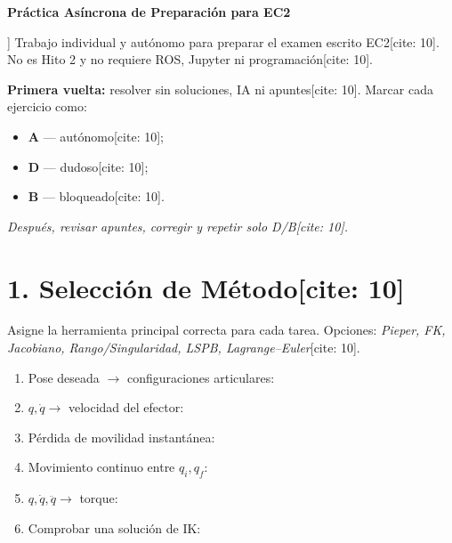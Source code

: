 \documentclass[11pt, a4paper]{article}
\begin{document}
\begin{center}
    \Large\textbf{\textcolor{ucbblue}{Práctica Asíncrona de Preparación para EC2}}\\[0.2cm]
\end{center}

\begin{tcolorbox}[colback=yellow!10, colframe=black, title=\textbf{Propósito y Metodología}[cite: 10]]
    Trabajo individual y autónomo para preparar el examen escrito EC2[cite: 10]. No es Hito 2 y no requiere ROS, Jupyter ni programación[cite: 10].
    
    \textbf{Primera vuelta:} resolver sin soluciones, IA ni apuntes[cite: 10]. Marcar cada ejercicio como:
    \begin{itemize}
        \item \textbf{A} — autónomo[cite: 10];
        \item \textbf{D} — dudoso[cite: 10];
        \item \textbf{B} — bloqueado[cite: 10].
    \end{itemize}
    \textit{Después, revisar apuntes, corregir y repetir solo D/B[cite: 10].}
\end{tcolorbox}

\section*{1. Selección de Método[cite: 10]}
Asigne la herramienta principal correcta para cada tarea. Opciones: \textit{Pieper, FK, Jacobiano, Rango/Singularidad, LSPB, Lagrange–Euler}[cite: 10].
\begin{enumerate}
    \item[a)] Pose deseada $\to$ configuraciones articulares: \underline{\hspace{4cm}}
    \item[b)] $q, \dot{q} \to$ velocidad del efector: \underline{\hspace{4cm}}
    \item[c)] Pérdida de movilidad instantánea: \underline{\hspace{4cm}}
    \item[d)] Movimiento continuo entre $q_i, q_f$: \underline{\hspace{4cm}}
    \item[e)] $q, \dot{q}, \ddot{q} \to$ torque: \underline{\hspace{4cm}}
    \item[f)] Comprobar una solución de IK: \underline{\hspace{4cm}}
\end{enumerate}
\end{document}
